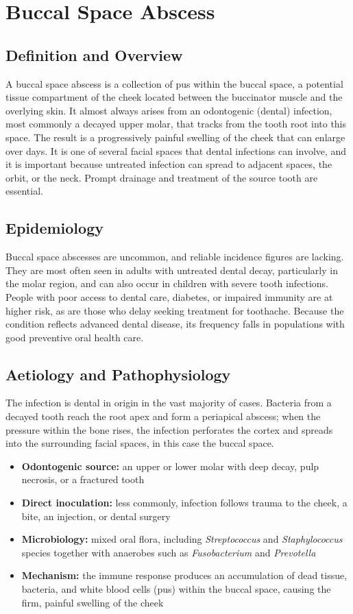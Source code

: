 \chapter{Buccal Space Abscess}

\section*{Definition and Overview}
A buccal space abscess is a collection of pus within the buccal space, a potential tissue compartment of the cheek located between the buccinator muscle and the overlying skin. It almost always arises from an odontogenic (dental) infection, most commonly a decayed upper molar, that tracks from the tooth root into this space. The result is a progressively painful swelling of the cheek that can enlarge over days. It is one of several facial spaces that dental infections can involve, and it is important because untreated infection can spread to adjacent spaces, the orbit, or the neck. Prompt drainage and treatment of the source tooth are essential.

\section*{Epidemiology}
Buccal space abscesses are uncommon, and reliable incidence figures are lacking. They are most often seen in adults with untreated dental decay, particularly in the molar region, and can also occur in children with severe tooth infections. People with poor access to dental care, diabetes, or impaired immunity are at higher risk, as are those who delay seeking treatment for toothache. Because the condition reflects advanced dental disease, its frequency falls in populations with good preventive oral health care.

\section*{Aetiology and Pathophysiology}
The infection is dental in origin in the vast majority of cases. Bacteria from a decayed tooth reach the root apex and form a periapical abscess; when the pressure within the bone rises, the infection perforates the cortex and spreads into the surrounding facial spaces, in this case the buccal space.

\begin{itemize}
    \item \textbf{Odontogenic source:} an upper or lower molar with deep decay, pulp necrosis, or a fractured tooth
    \item \textbf{Direct inoculation:} less commonly, infection follows trauma to the cheek, a bite, an injection, or dental surgery
    \item \textbf{Microbiology:} mixed oral flora, including \textit{Streptococcus} and \textit{Staphylococcus} species together with anaerobes such as \textit{Fusobacterium} and \textit{Prevotella}
    \item \textbf{Mechanism:} the immune response produces an accumulation of dead tissue, bacteria, and white blood cells (pus) within the buccal space, causing the firm, painful swelling of the cheek
\end{itemize}

